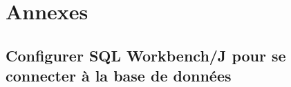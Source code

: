 \chapter{Annexes}
\section{Configurer SQL Workbench/J pour se connecter à la base de données}
\label{sqlworkbenchj}


%